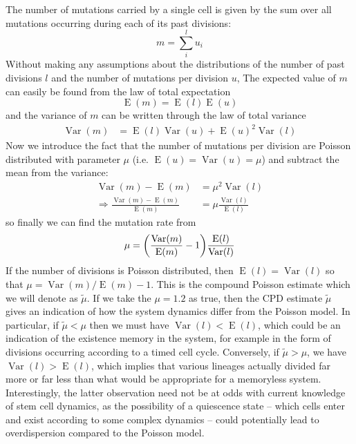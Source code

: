 \documentclass[pdftex,12pt,a4paper]{scrartcl}
\newcommand{\E}{\operatorname{E}}
\newcommand{\Var}{\operatorname{Var}}
\begin{document}
The number of mutations carried by a single cell is given by the sum over all mutations occurring during each of its past divisions:
\begin{equation}
    m = \sum_i^l u_i
\end{equation}
Without making any assumptions about the distributions of the number of past divisions $l$ and the number of mutations per division $u$, The expected value of $m$ can easily be found from the law of total expectation
\begin{equation}
    \E (m) = \E(l) \E(u)
\end{equation}
and the variance of $m$ can be written through the law of total variance
\begin{align}
    \Var(m) &= \E(l) \Var(u) + \E(u)^2 \Var(l)
\end{align}
Now we introduce the fact that the number of mutations per division are Poisson distributed with parameter $\mu$ (i.e. $\E(u) = \Var(u) = \mu$) and
subtract the mean from the variance:
\begin{align*}
    \Var(m) - \E(m) &= \mu^2 \Var(l) \\
    \Rightarrow \frac{\Var(m) - \E(m)}{\E(m)} &= \mu \frac{\Var(l)}{\E(l)}
\end{align*}
so finally we can find the mutation rate from
\begin{equation}
    \mu = \qty( \frac{\Var(m)}{\E(m)} - 1 ) \frac{\E(l)}{\Var(l)}
\end{equation}
If the number of divisions is Poisson distributed, then $\E(l) = \Var(l)$ so that $\mu = \Var(m)/\E(m) -1$. This is the compound Poisson estimate which we will denote as $\tilde{\mu}$. If we take the $\mu=1.2$ as true, then the CPD estimate $\tilde{\mu}$ gives an indication of how the system dynamics differ from the Poisson model. In particular, if $\tilde{\mu} < \mu$ then we must have $\Var(l) < \E(l)$, which could be an indication of the existence memory in the system, for example in the form of divisions occurring according to a timed cell cycle. Conversely, if $\tilde{\mu} > \mu$, we have $\Var(l) > \E(l)$, which implies that various lineages actually divided far more or far less than what would be appropriate for a memoryless system. Interestingly, the latter observation need not be at odds with current knowledge of stem cell dynamics, as the possibility of a quiescence state -- which cells enter and exist according to some complex dynamics -- could potentially lead to overdispersion compared to the Poisson model.
\end{document}
